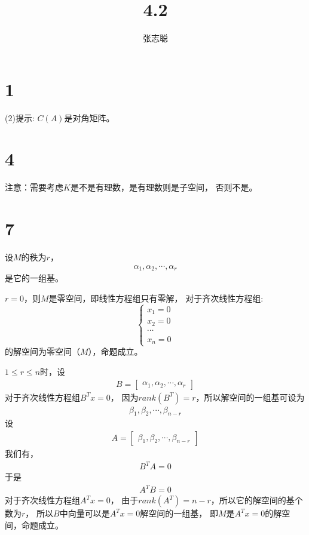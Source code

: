 \documentclass{article}
\begin{document}
\title{4.2}
\author{张志聪}
\maketitle

\section*{1}

 (2)提示: $C(A)$是对角矩阵。

\section*{4}

注意：需要考虑$K$是不是有理数，是有理数则是子空间，
否则不是。

\section*{7}

设$M$的秩为$r$，
\begin{align*}
  \alpha_1, \alpha_2, \cdots, \alpha_r
\end{align*}
是它的一组基。

$r = 0$，则$M$是零空间，即线性方程组只有零解，
对于齐次线性方程组:
\begin{equation*}
  \begin{cases*}
    x_1 = 0 \\
    x_2 = 0 \\
    \cdots  \\
    x_n = 0
  \end{cases*}
\end{equation*}
的解空间为零空间（$M$），命题成立。

$1 \leq r \leq n$时，设
\begin{align*}
  B = \begin{bmatrix}
        \alpha_1, \alpha_2, \cdots, \alpha_r
      \end{bmatrix}
\end{align*}
对于齐次线性方程组$B^T x = 0$，
因为$rank(B^T) = r$，所以解空间的一组基可设为
\begin{align*}
  \beta_1, \beta_2, \cdots, \beta_{n - r}
\end{align*}
设
\begin{align*}
  A = \begin{bmatrix}
        \beta_1, \beta_2, \cdots, \beta_{n - r}
      \end{bmatrix}
\end{align*}
我们有，
\begin{align*}
  B^T A = 0
\end{align*}
于是
\begin{align*}
  A^T B = 0
\end{align*}
对于齐次线性方程组$A^T x = 0$，
由于$rank(A^T) = n - r$，所以它的解空间的基个数为$r$，
所以$B$中向量可以是$A^T x = 0$解空间的一组基，
即$M$是$A^T x = 0$的解空间，命题成立。
\end{document}
